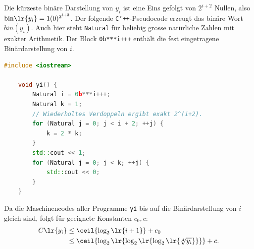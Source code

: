 \begin{questions}
\begin{solution}
		\vspace{\baselineskip}
		Die kürzeste binäre Darstellung von $y_i$ ist eine Eins gefolgt von $2^{i+2}$ Nullen, also $\text{bin}\lr{y_i} = 1(0)^{2^{i+2}}$. Der folgende \texttt{C'++}-Pseudocode erzeugt das binäre Wort $bin(y_i)$. Auch hier steht \texttt{Natural} für beliebig grosse natürliche Zahlen mit exakter Arithmetik. Der Block \texttt{0b***i+++} enthält die fest eingetragene Binärdarstellung von $i$.
		\begin{lstlisting}[language=C++,caption=$yi$]
    #include <iostream>

    void yi() {
        Natural i = 0b***i+++;
        Natural k = 1;
        // Wiederholtes Verdoppeln ergibt exakt 2^(i+2).
        for (Natural j = 0; j < i + 2; ++j) {
            k = 2 * k;
        }
        std::cout << 1;
        for (Natural j = 0; j < k; ++j) {
            std::cout << 0;
        }
    }
\end{lstlisting}
		Da die Maschinencodes aller Programme \texttt{yi} bis auf die Binärdarstellung von $i$ gleich sind, folgt für geeignete Konstanten $c_0,c$:
	\begin{align*}
		C\lr{y_i} &\leq \ceil{\log_2\lr{i+1}} + c_0\\
		&\leq \ceil{\log_2\lr{\log_2\lr{\log_2\lr{\sqrt[4]{y_i}}}}} + c.
	\end{align*}
	\end{solution}
\end{questions}
